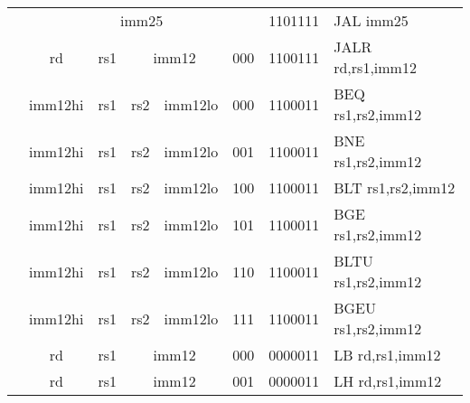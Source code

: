 \begin{table}[p]
\begin{small}
\begin{center}
\begin{tabular}{rccccccccccl}
&
\multicolumn{9}{|c|}{imm25} &
\multicolumn{1}{c|}{1101111} & JAL imm25 \\
\cline{2-11}
  

&
\multicolumn{1}{|c|}{rd} &
\multicolumn{1}{c|}{rs1} &
\multicolumn{5}{c|}{imm12} &
\multicolumn{2}{c|}{000} &
\multicolumn{1}{c|}{1100111} & JALR rd,rs1,imm12 \\
\cline{2-11}
  

&
\multicolumn{1}{|c|}{imm12hi} &
\multicolumn{1}{c|}{rs1} &
\multicolumn{1}{c|}{rs2} &
\multicolumn{4}{c|}{imm12lo} &
\multicolumn{2}{c|}{000} &
\multicolumn{1}{c|}{1100011} & BEQ rs1,rs2,imm12 \\
\cline{2-11}
  

&
\multicolumn{1}{|c|}{imm12hi} &
\multicolumn{1}{c|}{rs1} &
\multicolumn{1}{c|}{rs2} &
\multicolumn{4}{c|}{imm12lo} &
\multicolumn{2}{c|}{001} &
\multicolumn{1}{c|}{1100011} & BNE rs1,rs2,imm12 \\
\cline{2-11}
  

&
\multicolumn{1}{|c|}{imm12hi} &
\multicolumn{1}{c|}{rs1} &
\multicolumn{1}{c|}{rs2} &
\multicolumn{4}{c|}{imm12lo} &
\multicolumn{2}{c|}{100} &
\multicolumn{1}{c|}{1100011} & BLT rs1,rs2,imm12 \\
\cline{2-11}
  

&
\multicolumn{1}{|c|}{imm12hi} &
\multicolumn{1}{c|}{rs1} &
\multicolumn{1}{c|}{rs2} &
\multicolumn{4}{c|}{imm12lo} &
\multicolumn{2}{c|}{101} &
\multicolumn{1}{c|}{1100011} & BGE rs1,rs2,imm12 \\
\cline{2-11}
  

&
\multicolumn{1}{|c|}{imm12hi} &
\multicolumn{1}{c|}{rs1} &
\multicolumn{1}{c|}{rs2} &
\multicolumn{4}{c|}{imm12lo} &
\multicolumn{2}{c|}{110} &
\multicolumn{1}{c|}{1100011} & BLTU rs1,rs2,imm12 \\
\cline{2-11}
  

&
\multicolumn{1}{|c|}{imm12hi} &
\multicolumn{1}{c|}{rs1} &
\multicolumn{1}{c|}{rs2} &
\multicolumn{4}{c|}{imm12lo} &
\multicolumn{2}{c|}{111} &
\multicolumn{1}{c|}{1100011} & BGEU rs1,rs2,imm12 \\
\cline{2-11}
  

&
\multicolumn{1}{|c|}{rd} &
\multicolumn{1}{c|}{rs1} &
\multicolumn{5}{c|}{imm12} &
\multicolumn{2}{c|}{000} &
\multicolumn{1}{c|}{0000011} & LB rd,rs1,imm12 \\
\cline{2-11}
  

&
\multicolumn{1}{|c|}{rd} &
\multicolumn{1}{c|}{rs1} &
\multicolumn{5}{c|}{imm12} &
\multicolumn{2}{c|}{001} &
\multicolumn{1}{c|}{0000011} & LH rd,rs1,imm12 \\
\cline{2-11}
  


\end{tabular}
\end{center}
\end{small}
\end{table}

